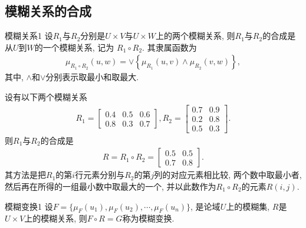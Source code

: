 \subsection{模糊关系的合成}
\begin{mydef}{模糊关系}{1}
    设$R_1$与$R_2$分别是$U\times V$与$U\times W$上的两个模糊关系, 则$R_1$与$R_2$的合成是从$U$到$W$的一个模糊关系, 记为   $R_1\circ R_2$. 其隶属函数为
\begin{align}
  \mu_{R_{1}\circ R_{2}}(u, w)=\vee\left\{\mu_{R_{1}}(u, v) \wedge \mu_{R_{2}}(v, w)\right\},
\end{align}
其中, $\wedge$和$\vee$分别表示取最小和取最大.
\end{mydef}

\begin{example}
设有以下两个模糊关系
\begin{align*}
    R_{1}=\left[\begin{array}{ccc}{0.4} & {0.5} & {0.6} \\ {0.8} & {0.3} & {0.7}\end{array}\right], R_{2}=\left[\begin{array}{cc}{0.7} & {0.9} \\ {0.2} & {0.8} \\ {0.5} & {0.3}\end{array}\right].
\end{align*}
则$R_1$与$R_2$的合成是
\begin{align}
    R=R_{1} \circ R_{2}=\left[\begin{array}{ll}{0.5} & {0.5} \\ {0.7} & {0.8}\end{array}\right].
\end{align}
其方法是把$R_1$的第$i$行元素分别与$R_2$的第$j$列的对应元素相比较, 两个数中取最小者, 然后再在所得的一组最小数中取最大的一个, 并以此数作为$R_1\circ R_2$的元素$R(i,j)$.
\end{example}
\begin{mydef}{模糊变换}{1}
    设$F=\{\mu_F(u_1),\mu_F(u_2),\cdots, \mu_F(u_n)\}$, 是论域$U$上的模糊集, $R$是$U\times V$上的模糊关系, 则$F\circ R=G$称为模糊变换.
\end{mydef}
